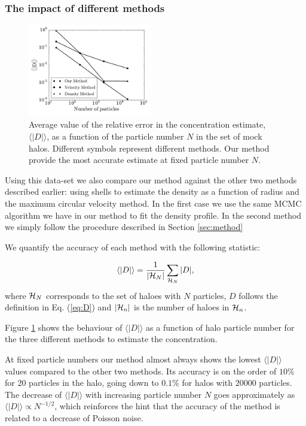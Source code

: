 \documentclass{emulateapj}
\newcommand{\avg}[1]{\langle{#1}\rangle}
\begin{document}
\subsubsection{The impact of different methods}

\begin{figure}
\begin{center}
  \includegraphics[width=0.48\textwidth]{error.pdf}
\end{center}
\caption{Average value of the relative error in the concentration
  estimate, $\avg{|D|}$, as a function of the particle number $N$ in
  the set of mock halos. Different symbols represent different
  methods. Our method provide the most accurate estimate at fixed
  particle number $N$.
    \label{fig:error}}
\end{figure}


Using this data-set we also compare our method against the other two
methods described earlier: using shells to estimate the density as a
function of radius and the maximum circular velocity method.
In the first case we use the same MCMC algorithm we
have in our method to fit the density profile.
In the second method we simply follow the procedure described in
Section \ref{sec:method}

We quantify the accuracy of each method with the following statistic:

\begin{equation}
\avg{|D|}=\frac{1}{\left|{\cal{H}}_N\right|}\sum_{{\cal{H}}_N} |D|,
\end{equation}
%
where ${\cal{H}}_N$ corresponds to the set of haloes with $N$
particles, $D$ follows the definition in Eq. (\ref{eq:D}) and
$\left|{\cal{H}}_n\right|$ is the number of haloes in ${\cal{H}}_n$.


Figure \ref{fig:error} shows the behaviour of $\avg{|D|}$ as a function of
halo particle number for the three different methods to estimate the
concentration.

At fixed particle numbers our method almost always shows the lowest
$\avg{|D|}$ values compared to the other two methods.
Its accuracy is on the order of $10\%$ for $20$ particles in the halo,
going down to $0.1\%$ for halos with $20000$ particles.
The decrease of $\avg{|D|}$ with increasing particle number $N$ goes
approximately as $\avg{|D|}\propto N^{-1/2}$, which reinforces the hint that
the accuracy of the method is related to a decrease of Poisson
noise.
\end{document}
